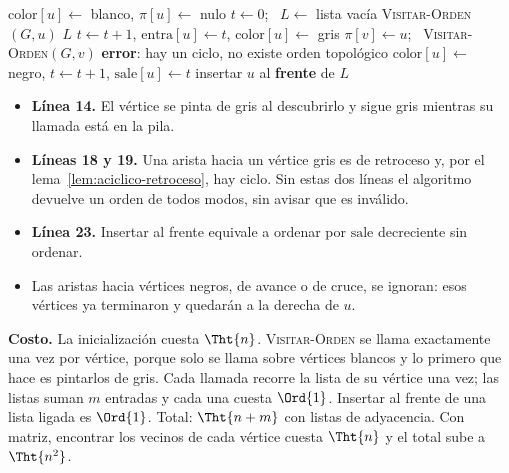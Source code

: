 \documentclass[11pt,letterpaper]{article}
\begin{document}
\begin{algorithm}[H]
\caption{\textsc{Orden-Topológico}$(G)$, con DFS y detección de
         ciclos}
\label{alg:orden-topologico}
\begin{algorithmic}[1]
    \State $\text{color}[u] \gets$ blanco, \quad $\pi[u] \gets$ nulo
  \EndFor
  \State $t \gets 0$; \ $L \gets$ lista vacía
      \State \textsc{Visitar-Orden}$(G, u)$
    \EndIf
  \EndFor
  \State \Return $L$
\EndProcedure
\Statex
{}
  \State $t \gets t + 1$, \quad $\text{entra}[u] \gets t$, \quad
         $\text{color}[u] \gets$ gris
      \State $\pi[v] \gets u$; \ \textsc{Visitar-Orden}$(G, v)$
     
      \State \textbf{error}: hay un ciclo, no existe orden topológico
    \EndIf
  \EndFor
  \State $\text{color}[u] \gets$ negro, \quad $t \gets t + 1$, \quad
         $\text{sale}[u] \gets t$
  \State insertar $u$ al \textbf{frente} de $L$
\EndProcedure
\end{algorithmic}
\end{algorithm}

\begin{itemize}[itemsep=0.1em]
  \item \textbf{Línea 14.} El vértice se pinta de gris al descubrirlo
        y sigue gris mientras su llamada está en la pila.
  \item \textbf{Líneas 18 y 19.} Una arista hacia un vértice gris es
        de retroceso y, por el lema~\ref{lem:aciclico-retroceso}, hay
        ciclo. Sin estas dos líneas el algoritmo devuelve un orden de
        todos modos, sin avisar que es inválido.
  \item \textbf{Línea 23.} Insertar al frente equivale a ordenar por
        $\text{sale}$ decreciente sin ordenar.
  \item Las aristas hacia vértices negros, de avance o de cruce, se
        ignoran: esos vértices ya terminaron y quedarán a la derecha de
        $u$.
\end{itemize}

\textbf{Costo.} La inicialización cuesta $\Tht{n}$.
\textsc{Visitar-Orden} se llama exactamente una vez por vértice,
porque solo se llama sobre vértices blancos y lo primero que hace es
pintarlos de gris. Cada llamada recorre la lista de su vértice una vez;
las listas suman $m$ entradas y cada una cuesta $\Ord{1}$. Insertar al
frente de una lista ligada es $\Ord{1}$. Total: $\Tht{n + m}$ con
listas de adyacencia. Con matriz, encontrar los vecinos de cada vértice
cuesta $\Tht{n}$ y el total sube a $\Tht{n^2}$.
\end{document}
